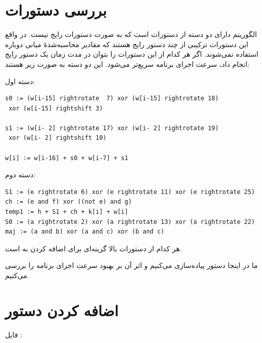 \documentclass[12pt,titlepage,a4page , tikz , multi,table , svgnames,xcdraw]{article}
\begin{document}
\newpage
\pagestyle{fancy}
\fancyhf{}
\fancyfoot{}

\cfoot{\thepage}

\newpage
\section{بررسی دستورات}
الگوریتم
دارای دو دسته از دستورات است که به صورت دستورات رایج
نیست. در واقع این دستورات ترکیبی از چند دستور رایج
هستند که مقادیر محاسبه‌شدهٔ میانی دوباره استفاده نمی‌شوند. اگر هر کدام از این دستورات را بتوان در مدت زمان یک دستور رایج
انجام داد، سرعت اجرای برنامه سریع‌تر می‌شود. این دو دسته به صورت زیر هستند:


دسته اول:

\begin{latin}
\begin{lstlisting}[columns=flexible]
s0 := (w[i-15] rightrotate  7) xor (w[i-15] rightrotate 18)
 xor (w[i-15] rightshift 3)
 
s1 := (w[i- 2] rightrotate 17) xor (w[i- 2] rightrotate 19)
 xor (w[i- 2] rightshift 10)
 
w[i] := w[i-16] + s0 + w[i-7] + s1
\end{lstlisting}
\end{latin}
\par
\par
دسته دوم:

\begin{latin}
\begin{lstlisting}[columns=flexible]
S1 := (e rightrotate 6) xor (e rightrotate 11) xor (e rightrotate 25)
ch := (e and f) xor ((not e) and g)
temp1 := h + S1 + ch + k[i] + w[i]
S0 := (a rightrotate 2) xor (a rightrotate 13) xor (a rightrotate 22)
maj := (a and b) xor (a and c) xor (b and c)
\end{lstlisting}
\end{latin}


هر کدام از دستورات بالا گزینه‌ای برای اضافه کردن به
است.

 ما در اینجا دستور
پیاده‌سازی می‌کنیم و اثر آن بر بهبود سرعت اجرای برنامه را بررسی می‌کنیم.
\newpage
\section{اضافه کردن دستور}
فایل
:
\end{document}
